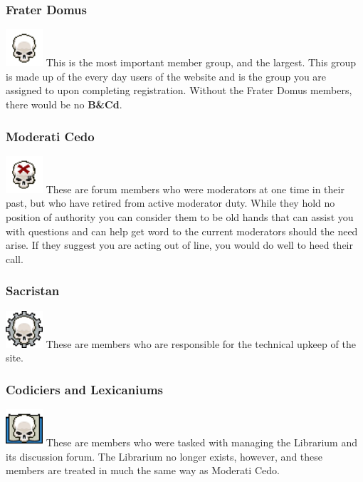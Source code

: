 \documentclass[12pt]{article}
\newcommand{\BnC}{{\textbf{B\&Cd}}}%
\begin{document}
\subsubsection{Frater Domus}
\includegraphics[width=39pt, height=39pt]{Frater.png}
This is the most important member group, and the largest. This group is 
made up of the every day users of the website and is the group you are 
assigned to upon completing registration. Without the Frater Domus 
members, there would be no {\BnC}.

\subsubsection{Moderati Cedo}
\includegraphics[width=39pt, height=39pt]{Cedo.png}
These are forum members who were moderators at one time in their past, 
but who have retired from active moderator duty. While they hold no 
position of authority you can consider them to be old hands that can 
assist you with questions and can help get word to the current 
moderators should the need arise. If they suggest you are acting out of 
line, you would do well to heed their call.


\subsubsection{Sacristan}
\includegraphics[width=39pt, height=39pt]{Tech.png}
These are members who are responsible for the technical upkeep of the 
site.


\subsubsection{Codiciers and Lexicaniums}
\includegraphics[width=39pt, height=39pt]{Lib.png}
These are members who were tasked with managing the Librarium and its 
discussion forum. The Librarium no longer exists, however, and these 
members are treated in much the same way as Moderati Cedo.
\end{document}
